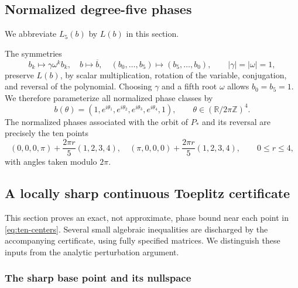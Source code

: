\documentclass[11pt]{article}
\newcommand{\R}{\mathbb R}
\begin{document}
\subsection{Normalized degree-five phases}
We abbreviate $L_5(b)$ by $L(b)$ in this section.

The symmetries
\begin{equation}\label{eq:phase-sym}
 b_k\mapsto\gamma\omega^k b_k,\quad
 b\mapsto\overline b,\quad
 (b_0,\ldots,b_5)\mapsto(b_5,\ldots,b_0),\qquad |\gamma|=|\omega|=1,
\end{equation}
preserve $L(b)$, by scalar multiplication, rotation of the variable, conjugation, and reversal of the polynomial. Choosing $\gamma$ and a fifth root $\omega$ allows $b_0=b_5=1$. We therefore parameterize all normalized phase classes by
\begin{equation}\label{eq:theta}
 b(\theta)=(1,e^{i\theta_1},e^{i\theta_2},e^{i\theta_3},e^{i\theta_4},1),
 \qquad \theta\in(\R/2\pi\mathbb Z)^4.
\end{equation}
The normalized phases associated with the orbit of $P_*$ and its reversal are precisely the ten points
\begin{equation}\label{eq:ten-centers}
 (0,0,0,\pi)+\frac{2\pi r}{5}(1,2,3,4),\quad
 (\pi,0,0,0)+\frac{2\pi r}{5}(1,2,3,4),\qquad 0\le r\le4,
\end{equation}
with angles taken modulo $2\pi$.

\subsection{A locally sharp continuous Toeplitz certificate}\label{sec:local}

This section proves an exact, not approximate, phase bound near each point in \eqref{eq:ten-centers}. Several small algebraic inequalities are discharged by the accompanying certificate, using fully specified matrices. We distinguish these inputs from the analytic perturbation argument.

\subsubsection{The sharp base point and its nullspace}
\end{document}
